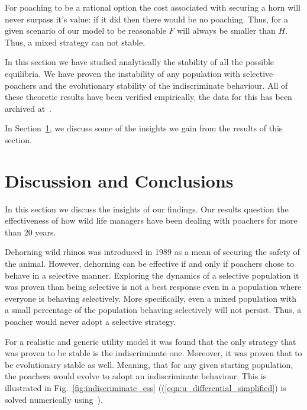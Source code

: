 \documentclass[10pt]{article}
\begin{document}
For poaching to be a rational option the cost associated with securing a horn
will never surpass it's value: if it did then there would be no poaching.
Thus, for a given scenario of our model
to be reasonable \(F\) will always be smaller than \(H\). Thus, a mixed strategy
can not stable.

In this section we have studied analytically the stability of all the possible
equilibria. We have proven the instability of any population with selective
poachers
and the evolutionary stability of the indiscriminate behaviour. 
All of these theoretic results have been verified empirically, the data for this
has been archived at~\cite{}.

In Section~\ref{section:discussion}, we discuss some of the insights we
gain from the results of this section.

\section{Discussion and Conclusions}
\label{section:discussion}

In this section we discuss the insights of our findings. Our results question
the effectiveness of how wild life managers have been dealing with poachers
for more than 20 years. 

Dehorning wild rhinos was introduced in 1989 as a mean of securing the
safety of the animal. However, dehorning can be effective if and only if
poachers chose to behave in a selective manner. Exploring the
dynamics of a selective population it was proven than being selective is not
a best response even in a population where everyone is behaving selectively.
More specifically, even a mixed population with a small percentage of the 
population behaving selectively will not persist. Thus, a poacher would never
adopt a selective strategy. 

For a realistic and generic utility model it was found that
the only strategy that was proven to be stable is the indiscriminate one.
Moreover, it was proven that to be evolutionary stable as well. Meaning, 
that for any given starting population, the poachers would evolve to adopt an
indiscriminate behaviour. This is illustrated in 
Fig.~\ref{fig:indiscriminate_ess} ((\ref{eqn:u_differential_simplified}) is 
solved numerically using~\cite{scipy}).
\end{document}
